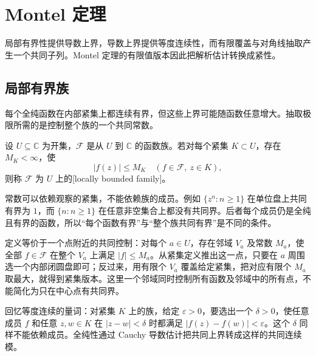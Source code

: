 \section{Montel 定理}
\label{b3:sec:0403}

局部有界性提供导数上界，导数上界提供等度连续性，而有限覆盖与对角线抽取产生一个共同子列。Montel 定理的有限值版本因此把解析估计转换成紧性。

\subsection{局部有界族}
\label{b3:subsec:040301}

每个全纯函数在内部紧集上都连续有界，但这些上界可能随函数任意增大。抽取极限所需的是控制整个族的一个共同常数。

\begin{definition}\label{b3:def:04-locally-bounded-family}
设 \(U\subseteq\mathbb C\) 为开集，\(\mathcal F\) 是从 \(U\) 到 \(\mathbb C\) 的函数族。若对每个紧集 \(K\subset U\)，存在 \(M_K<\infty\)，使
\[
 |f(z)|\le M_K\quad(f\in\mathcal F,\ z\in K),
\]
则称 \(\mathcal F\) 为 \(U\) 上的[locally bounded family]。
\end{definition}

常数可以依赖观察的紧集，不能依赖族的成员。例如 \(\{z^n:n\ge1\}\) 在单位盘上共同有界为 \(1\)，而 \(\{n:n\ge1\}\) 在任意非空集合上都没有共同界。后者每个成员仍是全纯且有界的函数，所以“每个函数有界”与“整个族共同有界”是不同的条件。

\ProseParagraphBreak

定义等价于一个点附近的共同控制：对每个 \(a\in U\)，存在邻域 \(V_a\) 及常数 \(M_a\)，使全部 \(f\in\mathcal F\) 在整个 \(V_a\) 上满足 \(|f|\le M_a\)。从紧集定义推出这一点，只要在 \(a\) 周围选一个内部闭圆盘即可；反过来，用有限个 \(V_a\) 覆盖给定紧集，把对应有限个 \(M_a\) 取最大，就得到紧集版本。这里一个邻域同时控制所有函数及邻域中的所有点，不能简化为只在中心点有共同界。

\ProseParagraphBreak

回忆等度连续的量词：对紧集 \(K\) 上的族，给定 \(\varepsilon>0\)，要选出一个 \(\delta>0\)，使任意成员 \(f\) 和任意 \(z,w\in K\) 在 \(|z-w|<\delta\) 时都满足 \(|f(z)-f(w)|<\varepsilon\)。这个 \(\delta\) 同样不能依赖成员。全纯性通过 Cauchy 导数估计把共同上界转成这样的共同连续模。

